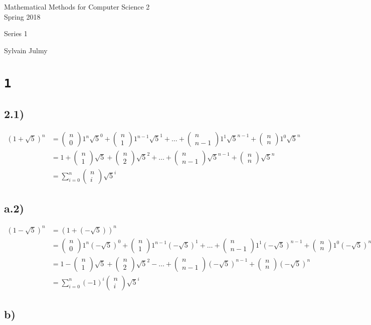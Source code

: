 \documentclass[a4paper,11pt]{report}
\author{Sylvain Julmy}
\date{\today}
\newcommand*{\bin}[2]{\begin{pmatrix}#1 \\ #2\end{pmatrix}}
\begin{document}
\begin{center}
  \Large{
    Mathematical Methods for Computer Science 2\\
    Spring 2018
  }
  \noindent\makebox[\linewidth]{\rule{\linewidth}{0.4pt}}

  Series 1
  \vspace*{1.4cm}

  Sylvain Julmy
  
  \noindent\makebox[\linewidth]{\rule{\linewidth}{0.4pt}}
\end{center}

\section*{\texttt{1}}

\subsection*{2.1)}

\begin{align*}
  (1 + \sqrt{5})^n &= \bin{n}{0} 1^{n} \sqrt{5}^{0} + \bin{n}{1} 1^{n-1} \sqrt{5}^{1} + \dots + \bin{n}{n-1} 1^{1} \sqrt{5}^{n-1} + \bin{n}{n} 1^{0} \sqrt{5}^{n} \\
                   &= 1 + \bin{n}{1} \sqrt{5} + \bin{n}{2} \sqrt{5}^{2} + \dots + \bin{n}{n-1} \sqrt{5}^{n-1} + \bin{n}{n} \sqrt{5}^{n} \\
                   &= \sum_{i=0}^{n} \bin{n}{i} \sqrt{5}^{i}
\end{align*}

\subsection*{a.2)}

\begin{align*}
  (1 - \sqrt{5})^n &= (1 + (-\sqrt{5}))^n \\
                   &= \bin{n}{0} 1^{n} (-\sqrt{5})^{0} + \bin{n}{1} 1^{n-1} (-\sqrt{5})^{1} + \dots + \bin{n}{n-1} 1^{1} (-\sqrt{5})^{n-1} + \bin{n}{n} 1^{0} (-\sqrt{5})^{n} \\
                   &= 1 - \bin{n}{1} \sqrt{5} + \bin{n}{2} \sqrt{5}^{2} - \dots + \bin{n}{n-1} (-\sqrt{5})^{n-1} + \bin{n}{n} (-\sqrt{5})^{n} \\
                   &= \sum_{i=0}^{n} (-1)^i \bin{n}{i} \sqrt{5}^{i}
\end{align*}

\subsection*{b)}
\end{document}
